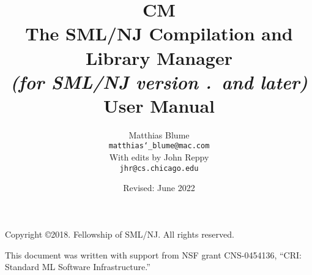 \documentclass[titlepage,letterpaper]{report}
\author{
  Matthias Blume \\
  \texttt{matthias\char`\_blume@mac.com}\\[0.5em]
  With edits by John Reppy\\
  \texttt{jhr@cs.chicago.edu}}
\date{Revised: June 2022}
\title{
  \textbf{CM}\\
  The SML/NJ Compilation and Library Manager \\
  \textit{\small (for SML/NJ version \smlmj.\smlmn~and later)} \\
  User Manual
}
\begin{document}



\maketitle

\phantom{.}
\thispagestyle{empty}

\noindent Copyright \copyright{}2018.  Fellowship of SML/NJ.  All rights reserved.

\vskip 12pt
\noindent This document was written with support from NSF grant CNS-0454136,
``CRI: Standard ML Software Infrastructure.''

\pagebreak

\tableofcontents

\pagebreak



















\pagebreak



\pagebreak

\appendix









\end{document}
